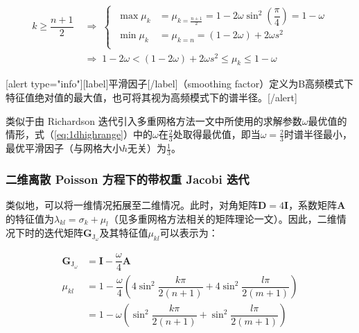 \documentclass[12pt, UTF8, nofonts]{ctexart}
\begin{document}
\begin{equation}
  \label{eq:1dhighrange}
  \begin{aligned}
    k \geq \dfrac{n+1}{2} \;&\Rightarrow\;
    \left\{\; \begin{aligned}
      \max\mu_k &= \mu_{k=\frac{n+1}{2}} = 1 - 2\omega \sin^2\left(\dfrac{\pi}{4}\right) = 1 - \omega \\
      \min\mu_k &= \mu_{k=n} = (1-2\omega)+2\omega s^2 \\
    \end{aligned}\right. \\
    &\Rightarrow\; 1-2\omega < (1-2\omega) + 2\omega s^2 \leq \mu_{k} \leq 1 - \omega
  \end{aligned}
\end{equation}

[alert type="info"][label]平滑因子[/label]（smoothing factor）定义为B高频模式下特征值绝对值的最大值，也可将其视为高频模式下的谱半径。[/alert]

类似于由 Richardson 迭代引入多重网格方法一文中所使用的求解参数$\omega$最优值的情形，式（\ref{eq:1dhighrange}）中的$\omega$在$\frac{2}{3}$处取得最优值，即当$\omega=\frac{2}{3}$时谱半径最小，最优平滑因子（与网格大小$h$无关）为$\frac{1}{3}$。



\subsubsection*{二维离散 Poisson 方程下的带权重 Jacobi 迭代}

类似地，可以将一维情况拓展至二维情况。此时，对角矩阵$\boldsymbol{D}=4\boldsymbol{I}$，系数矩阵$\boldsymbol{A}$的特征值为$\lambda_{kl}=\sigma_k+\mu_l$（见多重网格方法相关的矩阵理论一文）。因此，二维情况下时的迭代矩阵$\boldsymbol{G}_{\mathrm{J}_\omega}$及其特征值$\mu_{kl}$可以表示为：

\begin{equation}
  \label{eq:2dwjeig}
  \begin{aligned}
    \boldsymbol{G}_{\mathrm{J}_\omega} &= \boldsymbol{I} - \dfrac{\omega}{4}\boldsymbol{A} \\
    \mu_{kl} &= 1 - \dfrac{\omega}{4}\left(4\sin^2\dfrac{k\pi}{2(n+1)} + 4\sin^2\dfrac{l\pi}{2(m+1)}\right) \\
    &= 1 - \omega\left(\sin^2\dfrac{k\pi}{2(n+1)} + \sin^2\dfrac{l\pi}{2(m+1)}\right)
  \end{aligned}
\end{equation}
\end{document}
